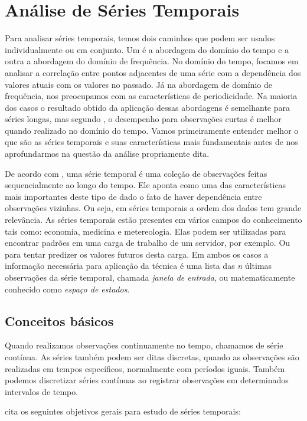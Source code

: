 \documentclass[twoside,english,brazilian]{UNISINOSmonografia}
\begin{document}
\section{Análise de Séries Temporais}
Para analisar séries temporais, temos dois caminhos que podem ser usados individualmente ou em conjunto. Um é a abordagem do domínio do tempo e a outra a abordagem do domínio de frequência. No domínio do tempo, focamos em analisar a correlação entre pontos adjacentes de uma série com a dependência dos valores atuais com os valores no passado. Já na abordagem de domínio de frequência, nos preocupamos com as características de periodicidade. Na maioria dos casos o resultado obtido da aplicação dessas abordagens é semelhante para séries longas, mas segundo \cite{Shumway2000}, o desempenho para observações curtas é melhor quando realizado no domínio do tempo.
Vamos primeiramente entender melhor o que são as séries temporais e suas características mais fundamentais antes de nos aprofundarmos na questão da análise propriamente dita.

De acordo com \cite{Ehlers2009}, uma série temporal é uma coleção de observações feitas sequencialmente ao longo do tempo. Ele aponta como uma das características mais importantes deste tipo de dado o fato de haver dependência entre observações vizinhas. Ou seja, em séries temporais a ordem dos dados tem grande relevância. As séries temporais estão presentes em vários campos do conhecimento tais como: economia, medicina e metereologia. Elas podem ser utilizadas para encontrar padrões em uma carga de trabalho de um servidor, por exemplo. Ou para tentar predizer os valores futuros desta carga. Em ambos os casos a informação necessária para aplicação da técnica é uma lista das \textit{n} últimas observações da série temporal, chamada \textit{janela de entrada}, ou matematicamente conhecido como \textit{espaço de estados}.

\subsection{Conceitos básicos}
Quando realizamos observações continuamente no tempo, chamamos de série contínua. As séries também podem ser ditas discretas, quando as observações são realizadas em tempos específicos, normalmente com períodos iguais. Também podemos discretizar séries contínuas ao registrar observações em determinados intervalos de tempo.

\cite{Ehlers2009} cita os seguintes objetivos gerais para estudo de séries temporais:
\end{document}
